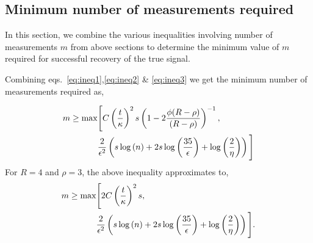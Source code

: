 \subsection{Minimum number of measurements required}
In this section, we combine the various inequalities involving number of measurements $m$ from above sections to determine the minimum value of $m$ required for successful recovery of the true signal.
%
%
%

Combining eqs.~\ref{eq:ineq1},\ref{eq:ineq2} \& \ref{eq:ineq3} we get the minimum number of measurements required as,

\begin{align}
m \geq \max & \Bigg[ C\left(\frac{t}{\kappa}\right)^2s \left(1-2\frac{\phi(R-\rho)}{(R-\rho)} \right)^{-1}, \nonumber \\ 
& \frac{2}{\epsilon^2}\left(s\log{(n)} + 2s\log{\left(\frac{35}{\epsilon}\right)}+\log{\left(\frac{2}{\eta}\right)}\right)\Bigg]
\label{eq:ineq4}
\end{align}
For $R=4$ and $\rho =3$, the above inequality approximates to,
\begin{align*}
m \geq \max & \Bigg[ 2C\left(\frac{t}{\kappa}\right)^2s, \nonumber \\ 
& \frac{2}{\epsilon^2}\left(s\log{(n)} + 2s\log{\left(\frac{35}{\epsilon}\right)}+\log{\left(\frac{2}{\eta}\right)}\right)\Bigg].
\end{align*}
